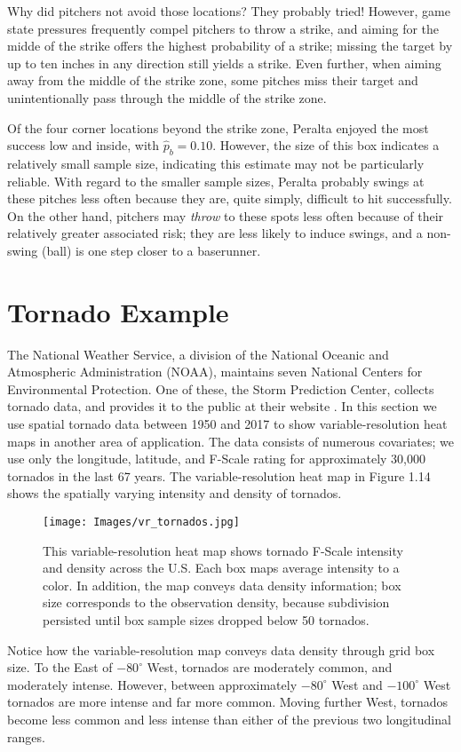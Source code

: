 Why did pitchers not avoid those locations? They probably tried! However, game state pressures frequently compel pitchers to throw a strike, and aiming for the midde of the strike offers the highest probability of a strike; missing the target by up to ten inches in any direction still yields a strike. Even further, when aiming away from the middle of the strike zone, some pitches miss their target and unintentionally pass through the middle of the strike zone. 

Of the four corner locations beyond the strike zone, Peralta enjoyed the most success low and inside, with $\hat{p}_{b} = 0.10$. However, the size of this box indicates a relatively small sample size, indicating this estimate may not be particularly reliable. With regard to the smaller sample sizes, Peralta probably swings at these pitches less often because they are, quite simply, difficult to hit successfully. On the other hand, pitchers may {\it throw} to these spots less often because of their relatively greater associated risk; they are less likely to induce swings, and a non-swing (ball) is one step closer to a baserunner. 


\section{Tornado Example}

The National Weather Service, a division of the National Oceanic and Atmospheric Administration (NOAA), maintains seven National Centers for Environmental Protection. One of these, the Storm Prediction Center, collects tornado data, and provides it to the public at their website \citep{NOAA}. In this section we use spatial tornado data between 1950 and 2017 to show variable-resolution heat maps in another area of application. The data consists of numerous covariates; we use only the longitude, latitude, and F-Scale rating for approximately 30,000 tornados in the last 67 years. The variable-resolution heat map in Figure 1.14 shows the spatially varying intensity and density of tornados.
        \begin{figure}[H]
      	\centering      
      	\texttt{[image: Images/vr\_tornados.jpg]}
      	\caption{This variable-resolution heat map shows tornado F-Scale intensity and density across the U.S. Each box maps average intensity to a color. In addition, the map conveys data density information; box size corresponds to the observation density, because subdivision persisted until box sample sizes dropped below 50 tornados.}
        \end{figure}
Notice how the variable-resolution map conveys data density through grid box size. To the East of $-80^{\circ}$ West, tornados are moderately common, and moderately intense. However, between approximately $-80^{\circ}$ West and $-100^{\circ}$ West tornados are more intense and far more common. Moving further West, tornados become less common and less intense than either of the previous two longitudinal ranges.

